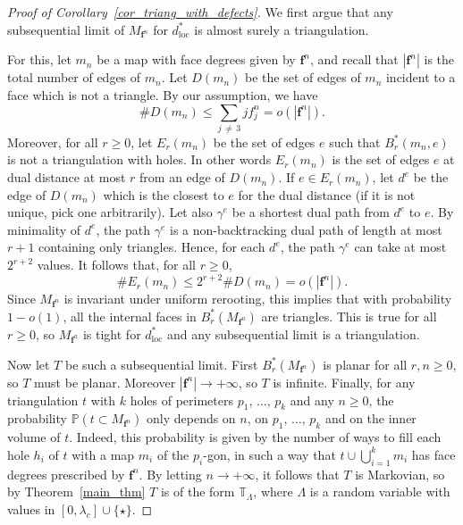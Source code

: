 \documentclass[AHL,Unicode,longabstracts,published]{cedram}
\newcommand{\loc}{\mathrm{loc}}
\newcommand{\TT}{\mathbb{T}}
\renewcommand{\P}{\mathbb{P}}
\newcommand{\bff}{\mathbf{f}}
\begin{document}
\begin{proof}[Proof of Corollary~\ref{cor_triang_with_defects}]
We first argue that any subsequential limit of $M_{\bff^n}$ for $d_{\loc}^*$ is almost surely a triangulation.

For this, let $m_n$ be a map with face degrees given by $\bff^n$, and recall that $|\bff^n|$ is the total number of edges of $m_n$. Let $D(m_n)$ be the set of edges of $m_n$ incident to a face which is not a triangle. By our assumption, we have
\[
\# D(m_n) \leq \sum_{j\,\ne\,3} j f_j^n = o \left(\left|\bff^n\right| \right).
\]
Moreover, for all $r \geq 0$, let $E_r(m_n)$ be the set of edges $e$ such that $B_r^*(m_n,e)$ is not a triangulation with holes. In other words $E_r(m_n)$ is the set of edges $e$ at dual distance at most $r$ from an edge of $D(m_n)$. If $e \in E_r(m_n)$, let $d^e$ be the edge of $D(m_n)$ which is the closest to $e$ for the dual distance (if it is not unique, pick one arbitrarily). Let also $\gamma^e$ be a shortest dual path from $d^e$ to $e$. By minimality of $d^e$, the path $\gamma^e$ is a non-backtracking dual path of length at most $r+1$ containing only triangles. Hence, for each $d^e$, the path $\gamma^e$ can take at most $2^{r+2}$ values. It follows that, for all $r \geq 0$,
\[
\# E_r(m_n) \leq 2^{r+2} \# D(m_n) = o \left(\left|\bff^n\right| \right).
\]
Since $M_{\bff^n}$ is invariant under uniform rerooting, this implies that with probability $1-o(1)$, all the internal faces in $B_r^* (M_{\bff^n})$ are triangles. This is true for all $r \geq 0$, so $M_{\bff^n}$ is tight for $d_{\loc}^*$ and any subsequential limit is a triangulation.

Now let $T$ be such a subsequential limit. First $B_r^* (M_{\bff^n})$ is planar for all $r,n \geq 0$, so $T$ must be planar. Moreover $|\bff^n| \to +\infty$, so $T$ is infinite. Finally, for any triangulation $t$ with $k$ holes of perimeters $p_1,\,\dots,\,p_k$ and any $n \geq 0$, the probability $\P (t \subset M_{\bff^n})$ only depends on $n$, on $p_1,\,\dots,\,p_k$ and on the inner volume of $t$. Indeed, this probability is given by the number of ways to fill each hole $h_i$ of $t$ with a map $m_i$ of the $p_i$-gon, in such a way that $t \cup \bigcup_{i=1}^k m_i$ has face degrees prescribed by $\bff^n$. By letting $n \to +\infty$, it follows that $T$ is Markovian, so by Theorem~\ref{main_thm} $T$ is of the form $\TT_{\Lambda}$, where $\Lambda$ is a random variable with values in $[0,\lambda_c] \cup \{ \star \}$.


\end{proof}
\end{document}
